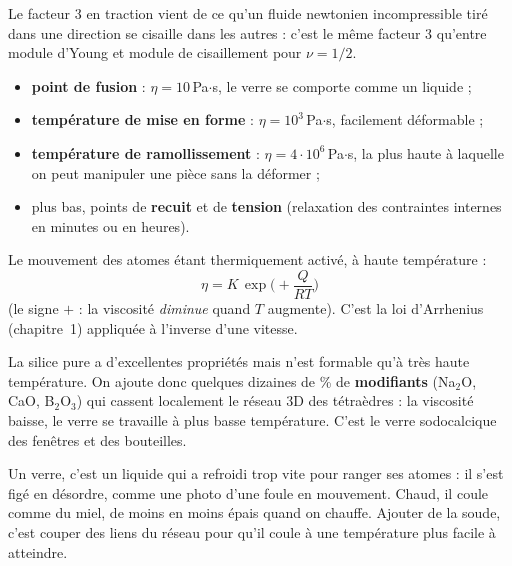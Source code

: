 Le facteur 3 en traction vient de ce qu'un fluide newtonien incompressible tiré dans une
direction se cisaille dans les autres : c'est le même facteur 3 qu'entre module d'Young et
module de cisaillement pour $\nu = 1/2$.


\begin{defnbox}[title=Les températures repères du verre (par la viscosité)]
\begin{itemize}
  \item \textbf{point de fusion} : $\eta = 10$\,Pa$\cdot$s, le verre se comporte comme un liquide ;
  \item \textbf{température de mise en forme} : $\eta = 10^3$\,Pa$\cdot$s, facilement déformable ;
  \item \textbf{température de ramollissement} : $\eta = 4\cdot10^6$\,Pa$\cdot$s, la plus haute
        à laquelle on peut manipuler une pièce sans la déformer ;
  \item plus bas, points de \textbf{recuit} et de \textbf{tension} (relaxation des contraintes
        internes en minutes ou en heures).
\end{itemize}
\end{defnbox}

\begin{thmbox}[title={Viscosité et température}]
Le mouvement des atomes étant thermiquement activé, à haute température :
\[ \eta = K\,\exp\!\Big(+\frac{Q}{RT}\Big) \]
(le signe $+$ : la viscosité \emph{diminue} quand $T$ augmente). C'est la loi d'Arrhenius
(chapitre~1) appliquée à l'inverse d'une vitesse.
\end{thmbox}

\begin{propbox}[title={Les modifiants de réseau}]
La silice pure a d'excellentes propriétés mais n'est formable qu'à très haute température. On
ajoute donc quelques dizaines de \% de \textbf{modifiants} (Na$_2$O, CaO, B$_2$O$_3$) qui
\og cassent\fg{} localement le réseau 3D des tétraèdres : la viscosité baisse, le verre se
travaille à plus basse température. C'est le verre sodocalcique des fenêtres et des bouteilles.
\end{propbox}

\begin{goatbox}
Un verre, c'est un liquide qui a refroidi trop vite pour ranger ses atomes : il s'est figé en
désordre, comme une photo d'une foule en mouvement. Chaud, il coule comme du miel, de moins en
moins épais quand on chauffe. Ajouter de la soude, c'est couper des liens du réseau pour qu'il
coule à une température plus facile à atteindre.
\end{goatbox}

